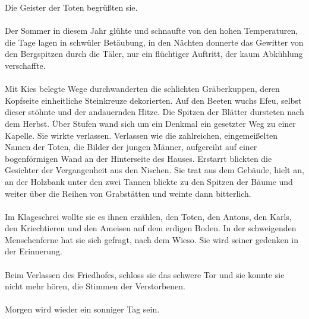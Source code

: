 Die Geister der Toten begrüßten sie.\\\\
Der Sommer in diesem Jahr glühte und schnaufte von den hohen Temperaturen, die Tage lagen in schwüler Betäubung, in den Nächten donnerte das Gewitter von den Bergspitzen durch die Täler, nur ein flüchtiger Auftritt, der kaum Abkühlung verschaffte. \\\\
Mit Kies belegte Wege durchwanderten die schlichten Gräberkuppen, deren Kopfseite einheitliche Steinkreuze dekorierten. Auf den Beeten wuchs Efeu, selbst dieser stöhnte und der andauernden Hitze. Die Spitzen der Blätter dursteten nach dem Herbst. Über Stufen wand sich um ein Denkmal ein gesetzter Weg zu einer Kapelle. Sie wirkte verlassen. Verlassen wie die zahlreichen, eingemeißelten Namen der Toten, die Bilder der jungen Männer, aufgereiht auf einer bogenförmigen Wand an der Hinterseite des Hauses. Erstarrt blickten die Gesichter der Vergangenheit aus den Nischen. Sie trat aus dem Gebäude, hielt an, an der Holzbank unter den zwei Tannen blickte zu den Spitzen der Bäume und weiter über die Reihen von Grabstätten und weinte dann bitterlich.\\\\
Im Klageschrei wollte sie es ihnen erzählen, den Toten, den Antons, den Karls, den Kriechtieren und den Ameisen auf dem erdigen Boden. In der schweigenden Menschenferne hat sie sich gefragt, nach dem Wieso. Sie wird seiner gedenken in der Erinnerung.\\\\
Beim Verlassen des Friedhofes, schloss sie das schwere Tor und sie konnte sie nicht mehr hören, die Stimmen der Verstorbenen.\\\\

Morgen wird wieder ein sonniger Tag sein. 